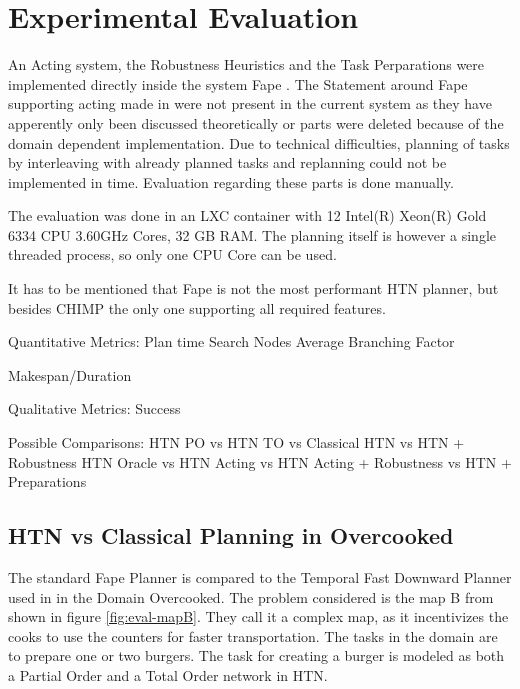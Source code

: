 \section{Experimental Evaluation}\label{sec:evaluation}

An Acting system, the Robustness Heuristics and the Task Perparations were implemented directly inside the system Fape \citep{bit-monnotFAPEConstraintbasedPlanner2020}.
The Statement around Fape supporting acting made in \cite{bit-monnotTemporalHierarchicalModels2016a} were not present in the current system as they have apperently only been discussed theoretically or parts were deleted because of the domain dependent implementation.
Due to technical difficulties, planning of tasks by interleaving with already planned tasks and replanning could not be implemented in time.
Evaluation regarding these parts is done manually.

The evaluation was done in an LXC container with 12 Intel(R) Xeon(R) Gold 6334 CPU 3.60GHz Cores, 32 GB RAM.
The planning itself is however a single threaded process, so only one CPU Core can be used.

It has to be mentioned that Fape is not the most performant HTN planner, but besides CHIMP the only one supporting all required features.

Quantitative Metrics:
Plan time
Search Nodes
Average Branching Factor

Makespan/Duration

Qualitative Metrics:
Success

Possible Comparisons:
HTN PO vs HTN TO vs Classical \citep{yuxinliuPlanningOvercookedGame2020}
HTN vs HTN + Robustness
HTN Oracle vs HTN Acting vs HTN Acting + Robustness vs HTN + Preparations


\subsection{HTN vs Classical Planning in Overcooked}


The standard Fape Planner is compared to the Temporal Fast Downward Planner used in \cite{yuxinliuPlanningOvercookedGame2020} in the Domain Overcooked.
The problem considered is the map B from \cite{yuxinliuPlanningOvercookedGame2020} shown in figure \ref{fig:eval-mapB}.
They call it a complex map, as it incentivizes the cooks to use the counters for faster transportation.
The tasks in the domain are to prepare one or two burgers.
The task for creating a burger is modeled as both a Partial Order and a Total Order network in HTN.